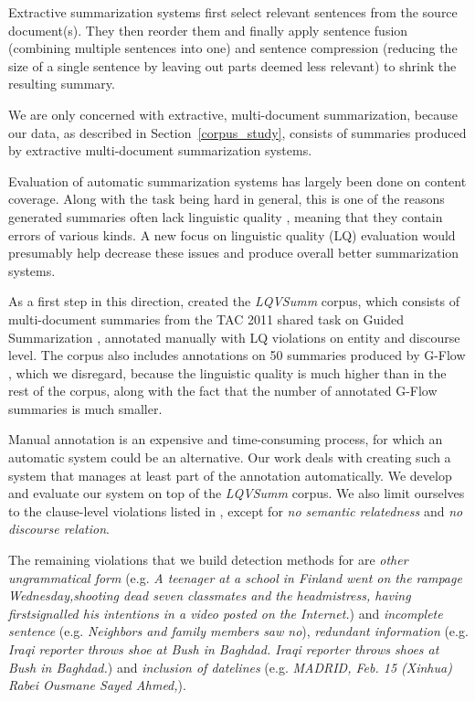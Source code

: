 \documentclass[a4paper,10pt]{scrartcl}
\theoremstyle{style}
\begin{document}
Extractive summarization systems first select relevant sentences from the source document(s). They then reorder them and finally apply sentence fusion (combining multiple sentences into one) and sentence compression (reducing the size of a single sentence by leaving out parts deemed less relevant) to shrink the resulting summary.

We are only concerned with extractive, multi-document summarization, because our data, as described in Section~\ref{corpus_study}, consists of summaries produced by extractive multi-document summarization systems.

Evaluation of automatic summarization systems has largely been done on content coverage. Along with the task being hard in general, this is one of the reasons generated summaries often lack linguistic quality \citep{nenkova2011foundations}, meaning that they contain errors of various kinds. A new focus on linguistic quality (LQ) evaluation would presumably help decrease these issues and produce overall better summarization systems.

As a first step in this direction, \cite{friedrichlqvsumm} created the \textit{LQVSumm} corpus, which consists of multi-document summaries from the TAC 2011 shared task on Guided Summarization \citep{owczarzak2011overview}, annotated manually with LQ violations on entity and discourse level.
The corpus also includes annotations on 50 summaries produced by G-Flow \citep{gflow}, which we disregard, because the linguistic quality is much higher than in the rest of the corpus, along with the fact that the number of annotated G-Flow summaries is much smaller.

Manual annotation is an expensive and time-consuming process, for which an automatic system could be an alternative. Our work deals with creating such a system that manages at least part of the annotation automatically. We develop and evaluate our system on top of the \textit{LQVSumm} corpus. We also limit ourselves to the clause-level violations listed in \cite{friedrichlqvsumm}, except for \textit{no semantic relatedness} and \textit{no discourse relation}.

The remaining violations that we build detection methods for are \textit{other ungrammatical form} (e.g. \textit{A teenager at a school in Finland went on the rampage Wednesday,shooting dead seven classmates and the headmistress, having firstsignalled his intentions in a video posted on the Internet.}) and \textit{incomplete sentence} (e.g. \textit{Neighbors and family members saw no}), \textit{redundant information} (e.g. \textit{Iraqi reporter throws shoe at Bush in Baghdad. Iraqi reporter throws shoes at Bush in Baghdad.}) and \textit{inclusion of datelines} (e.g. \textit{MADRID, Feb. 15 (Xinhua) Rabei Ousmane Sayed Ahmed,}).
\end{document}
